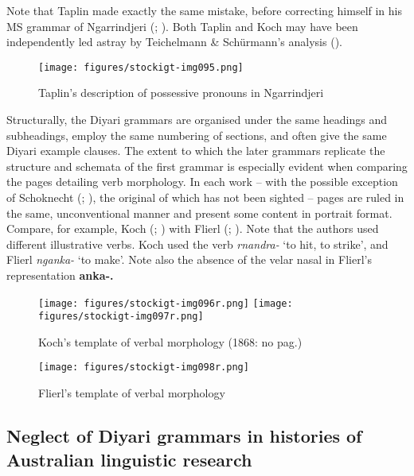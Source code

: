Note that Taplin made exactly the same mistake, before correcting himself in his MS grammar of Ngarrindjeri (\citeyear{taplin_vocabulary_1867}; ). Both Taplin and Koch may have been independently led astray by Teichelmann \& Schürmann’s analysis ().


\begin{figure}
\texttt{[image: figures/stockigt-img095.png]}
\caption{Taplin’s description of possessive pronouns in Ngarrindjeri \citeyearpar{taplin_vocabulary_1867}}
\label{bkm:Ref449374077}\label{fig:key:148}
\end{figure}

Structurally, the Diyari grammars are organised under the same headings and subheadings, employ the same numbering of sections, and often give the same Diyari example clauses. The extent to which the later grammars replicate the structure and schemata of the first grammar \citep{koch_untitled_1868} is especially evident when comparing the pages detailing verb morphology. In each work – with the possible exception of Schoknecht (\citeyear{schoknecht_grammar_1947}; ), the original of which has not been sighted – pages are ruled in the same, unconventional manner and present some content in portrait format. Compare, for example, Koch (\citeyear{koch_untitled_1868}; ) with Flierl (\citeyear{flierl_dieri_1880}; ). Note that the authors used different illustrative verbs. Koch used the verb \textit{rnandra-} `to hit, to strike', and Flierl \textit{nganka-} `to make'. Note also the absence of the velar nasal in Flierl’s representation \textbf{anka-.}

\begin{figure}
\texttt{[image: figures/stockigt-img096r.png]}
\texttt{[image: figures/stockigt-img097r.png]}
\caption{Koch’s template of verbal morphology (1868: no pag.)}
\label{bkm:Ref449374106}\label{fig:key:149}
\end{figure}

\begin{figure}
\texttt{[image: figures/stockigt-img098r.png]}
\caption{Flierl’s template of verbal morphology \citeyearpar[48]{flierl_christianieli_1880}}
\label{bkm:Ref449374123}\label{fig:key:150}
\end{figure}

\subsection{Neglect of Diyari grammars in histories of Australian linguistic research}
\label{sec:key:8.2.1}\label{bkm:Ref456104302}

